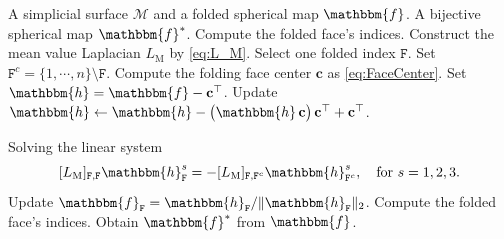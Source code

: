\documentclass{article}
\numberwithin{equation}{section}
\def\c{\mathbf{c}}
\def\bf{\mathbbm{f}}
\def\bh{\mathbbm{h}}
\def\bF{\mathtt{F}}
\def\M{\mathcal{M}}
\begin{document}
\begin{algorithm}[t]
\caption{Riemannian bijective correction for spherical mappings}
\label{alg:bij_cor}
\begin{algorithmic}[1]
\Require A simplicial surface $\M$ and a folded spherical map $\bf$.
\Ensure A bijective spherical map $\bf^*$.
\State Compute the folded face's indices.
    \State Construct the mean value Laplacian $L_\mathrm{M}$ by \eqref{eq:L_M}. 
        \State Select one folded index $\mathtt{F}$.
        \State Set $\mathtt{F}^c = \{1, \cdots, n\} \setminus \mathtt{F}$.
        \State Compute the folding face center $\c$ as \eqref{eq:FaceCenter}.
        \State Set $\bh = \bf - \c^\top$.
        \State Update $\bh \leftarrow \bh - \big( \bh \,\c \big)\, \c^\top + \c^\top$.

        \State Solving the linear system $$ [L_\mathrm{M}]_{\bF, \bF} \bh^s_{\bF} = - [L_\mathrm{M}]_{\bF, \bF^c} \bh^s_{\bF^c}, ~~~\mbox{for}~s = 1,2,3.$$
        \State Update $\bf_\bF = \bh_{\bF} / \|\bh_{\bF}\|_2$.
    \EndFor
    \State Compute the folded face's indices.
\EndWhile
\State Obtain $\bf^*$ from $\bf$.
\end{algorithmic}
\end{algorithm}
\end{document}
